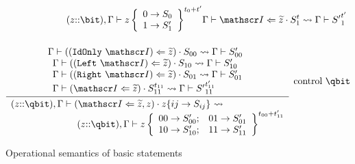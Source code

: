 \begin{figure}[htbp]
\[\begin{gathered}
{     {\qquad\qquad\qquad(z{::}\bit),\Gamma\qentail\qsbitUp{z}{S_0}{S'_1}{t_0+t'}}}
{\qresultsin{\Gamma \qentail  \qop{\qcontrolled{\qins}{\qvec{z}}}{S_1^t}}
   {\Gamma\qentail {S'}_1^{t'}}}\\[12pt]
\infer[{\raisebox{8ex}{control \qbit}}]
   {\qresultsinUp{(z{::}\qbit),\Gamma \qentail \qop{(\qcontrolled{\qins}{\qvec{z},z})}
                    {\qsnodeij{z}{ij}{S_{ij}}{}}}
         {\qquad\qquad\quad(z{::}\qbit),\Gamma \qentail \qsqbitUp{z}{S'_{00}}{S'_{01}}{S'_{10}}{S'_{11}}{t_{00}+t'_{11}}}}
   {\stacktwo{\qresultsin{\Gamma \qentail  
                \qop{(\qcontrolled{(\IdOnly\ \qins)}{\qvec{z}})}{S_{00}}}
                {\Gamma\qentail S'_{00}}}
    {\stackthree{\qresultsin{\Gamma \qentail  
                \qop{(\qcontrolled{(\Left\ \qins)}{\qvec{z}})}{S_{10}}}
                {\Gamma\qentail S'_{10}}}
   {\qresultsin{\Gamma \qentail  
                \qop{(\qcontrolled{(\Right\ \qins)}{\qvec{z}})}{S_{01}}}
                {\Gamma\qentail S'_{01}}}
    {\qresultsin{\Gamma \qentail  
                \qop{(\qcontrolled{\qins}{\qvec{z}})}{S_{11}^{t_{11}}}}
                {\Gamma\qentail {S'}_{11}^{t'_{11}}}}}}
\end{gathered}
\]
\caption{Operational semantics of basic \lqpl{} statements}\label{fig:qsstatementtransitionspartone}
\end{figure}



